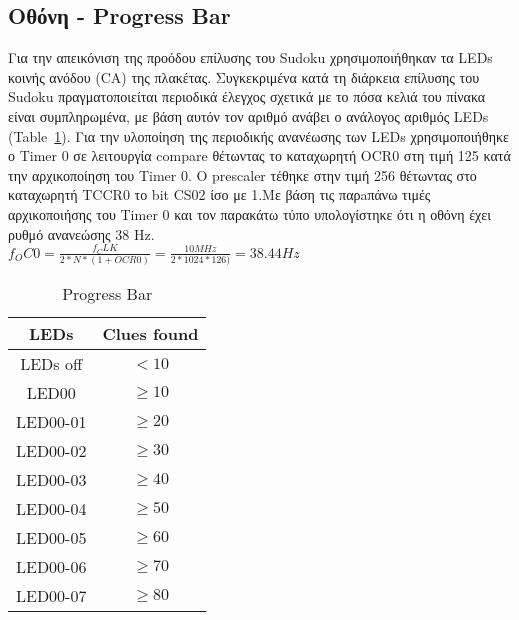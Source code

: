 \documentclass[a4paper,12pt]{article}
\begin{document}
\subsection{Οθόνη - Progress Bar}
Για την απεικόνιση της προόδου επίλυσης του Sudoku χρησιμοποιήθηκαν τα LEDs κοινής ανόδου (CA) της πλακέτας. Συγκεκριμένα κατά τη διάρκεια επίλυσης του Sudoku πραγματοποιείται περιοδικά έλεγχος σχετικά με το πόσα κελιά του πίνακα είναι συμπληρωμένα, με βάση αυτόν τον αριθμό ανάβει ο ανάλογος αριθμός LEDs (Table~\ref{table:progress_bar}).
Για την υλοποίηση της περιοδικής ανανέωσης των LEDs χρησιμοποιήθηκε ο Timer 0 σε λειτουργία compare θέτωντας το καταχωρητή OCR0 στη τιμή 125 κατά την αρχικοποίηση του Timer 0. Ο prescaler τέθηκε στην τιμή 256 θέτωντας στο καταχωρητή TCCR0 το bit CS02 ίσο με 1.Με βάση τις παρaπάνω τιμές αρχικοποιήσης του Timer 0 και τον παρακάτω τύπο υπολογίστηκε ότι η οθόνη έχει ρυθμό ανανεώσης 38 Hz.\\
$f_OC0 =\frac{f_CLK}{2*N*(1+OCR0)} = \frac{10 MHz}{2*1024*126)} = 38.44 Hz$ \\


\begin{table}[h!]
\centering
\begin{tabular}[c]{| c | c |}
\hline
LEDs & Clues found \\
\hline
LEDs off & $< 10$ \\
\hline
LED00 &  $\geq 10$ \\
\hline
LED00-01 & $\geq 20$ \\
\hline
LED00-02 & $\geq 30$ \\
\hline
LED00-03 & $\geq 40$ \\
\hline
LED00-04 & $\geq 50$ \\
\hline
LED00-05 & $\geq 60$ \\
\hline
LED00-06 & $\geq 70$ \\
\hline
LED00-07 & $\geq 80$ \\
\hline
\end{tabular}
\caption{Progress Bar}
\label{table:progress_bar}
\end{table}





\end{document}
